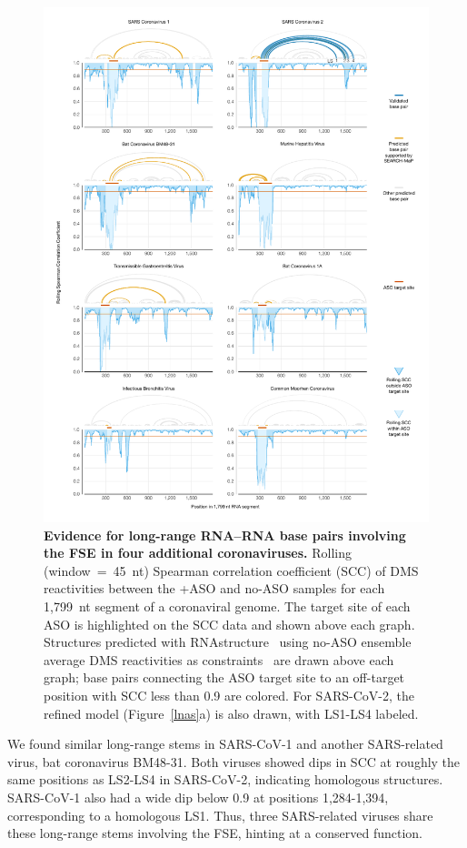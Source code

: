 \documentclass[main.tex]{subfiles}
\begin{document}
\begin{figure}[H]
	\includegraphics[width=\textwidth]{../MainFigures/covs/covs.pdf}
	\caption{\textbf{Evidence for long-range RNA--RNA base pairs involving the FSE in four additional coronaviruses.} Rolling (window~=~45~nt) Spearman correlation coefficient (SCC) of DMS reactivities between the +ASO and no-ASO samples for each 1,799~nt segment of a coronaviral genome. The target site of each ASO is highlighted on the SCC data and shown above each graph. Structures predicted with RNAstructure~\cite{Reuter2010} using no-ASO ensemble average DMS reactivities as constraints~\cite{Cordero2012} are drawn above each graph; base pairs connecting the ASO target site to an off-target position with SCC less than 0.9 are colored. For SARS-CoV-2, the refined model (Figure~\ref{lnas}a) is also drawn, with LS1-LS4 labeled.}
	\label{covs}
\end{figure}

We found similar long-range stems in SARS-CoV-1 and another SARS-related virus, bat coronavirus BM48-31.
Both viruses showed dips in SCC at roughly the same positions as LS2-LS4 in SARS-CoV-2, indicating homologous structures.
SARS-CoV-1 also had a wide dip below 0.9 at positions 1,284-1,394, corresponding to a homologous LS1.
Thus, three SARS-related viruses share these long-range stems involving the FSE, hinting at a conserved function.
\end{document}
